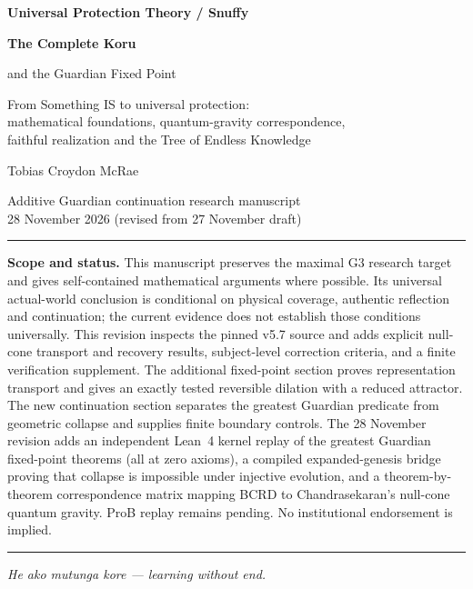 \documentclass[11pt,a4paper]{article}
\begin{document}
\begin{titlepage}
\vspace*{22mm}
{\large\color{ink}\textbf{Universal Protection Theory / Snuffy}\par}
\vspace{12mm}
{\Huge\bfseries The Complete Koru\par and the Guardian Fixed Point\par}
\vspace{7mm}
{\Large From Something IS to universal protection:\\ mathematical foundations, quantum-gravity correspondence,\\ faithful realization and the Tree of Endless Knowledge\par}
\vspace{14mm}
{\large Tobias Croydon McRae\par}
{\small Additive Guardian continuation research manuscript\\28 November 2026 (revised from 27 November draft)\par}
\vfill
\hrule\vspace{5mm}
\textbf{Scope and status.} This manuscript preserves the maximal G3 research target and gives self-contained mathematical arguments where possible. Its universal actual-world conclusion is conditional on physical coverage, authentic reflection and continuation; the current evidence does not establish those conditions universally. This revision inspects the pinned v5.7 source and adds explicit null-cone transport and recovery results, subject-level correction criteria, and a finite verification supplement. The additional fixed-point section proves representation transport and gives an exactly tested reversible dilation with a reduced attractor. The new continuation section separates the greatest Guardian predicate from geometric collapse and supplies finite boundary controls. The 28 November revision adds an independent Lean~4 kernel replay of the greatest Guardian fixed-point theorems (all at zero axioms), a compiled expanded-genesis bridge proving that collapse is impossible under injective evolution, and a theorem-by-theorem correspondence matrix mapping BCRD to Chandrasekaran's null-cone quantum gravity. ProB replay remains pending. No institutional endorsement is implied.\vspace{5mm}\hrule
\vspace{8mm}
\textit{He ako mutunga kore — learning without end.}
\end{titlepage}
\end{document}

